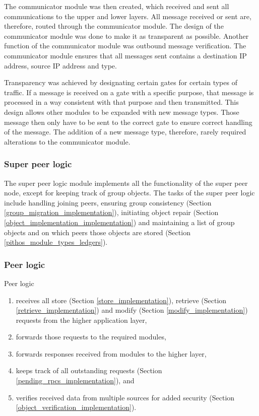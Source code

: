 The communicator module was then created, which received and sent all communications to the upper and lower layers. All message received or sent are, therefore, routed through the communicator module. The design of the communicator module was done to make it as transparent as possible. Another function of the communicator module was outbound message verification. The communicator module ensures that all messages sent contains a destination IP address, source IP address and type.

Transparency was achieved by designating certain gates for certain types of traffic. If a message is received on a gate with a specific purpose, that message is processed in a way consistent with that purpose and then transmitted. This design allows other modules to be expanded with new message types. Those message then only have to be sent to the correct gate to ensure correct handling of the message. The addition of a new message type, therefore, rarely required alterations to the communicator module.

\subsubsection{Super peer logic}
\label{pithos_module_types_sp_logic}

The super peer logic module implements all the functionality of the super peer node, except for keeping track of group objects. The tasks of the super peer logic include handling joining peers, ensuring group consistency (Section \ref{group_migration_implementation}), initiating object repair (Section \ref{object_implementation_implementation}) and maintaining a list of group objects and on which peers those objects are stored (Section \ref{pithos_module_types_ledgers}).

\subsubsection{Peer logic}

Peer logic
\begin{enumerate}
  \item  receives all store (Section \ref{store_implementation}), retrieve (Section \ref{retrieve_implementation}) and modify (Section \ref{modify_implementation}) requests from the higher application layer,
  \item forwards those requests to the required modules,
  \item forwards responses received from modules to the higher layer,
  \item keeps track of all outstanding requests (Section \ref{pending_rpcs_implementation}), and
  \item verifies received data from multiple sources for added security (Section \ref{object_verification_implementation}).
\end{enumerate}

